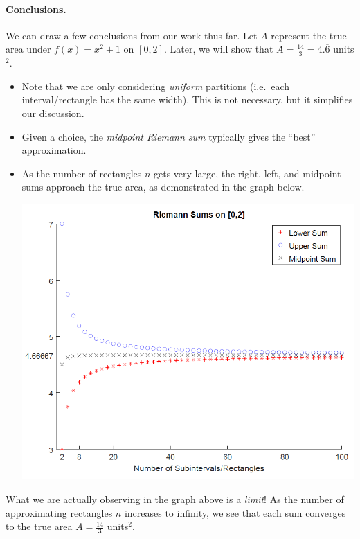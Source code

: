 \documentclass[12pt]{article}
\begin{document}
\newpage

\paragraph{Conclusions.} We can draw a few conclusions from our work thus far. Let $A$ represent the true area under $f(x)=x^2+1$ on $[0,2]$. Later, we will show that $A=\frac{14}{3}=4.\overline{6}$ units$^2$.
\begin{itemize}
	\item Note that we are only considering \textit{uniform} partitions (i.e.\ each interval/rectangle has the same width). This is not necessary, but it simplifies our discussion.
	\item Given a choice, the \textit{midpoint Riemann sum} typically gives the ``best'' approximation.
	\item As the number of rectangles $n$ gets very large, the right, left, and midpoint sums approach the true area, as demonstrated in the graph below.
	
	\begin{center}
		\includegraphics[scale=.9]{MATH_1060_Section_5-1_Riemann_Sums.PNG}
	\end{center}
\end{itemize}

What we are actually observing in the graph above is a \textit{limit}! As the number of approximating rectangles $n$ increases to infinity, we see that each sum converges to the true area $A=\frac{14}{3}$ units$^2$.
\end{document}
